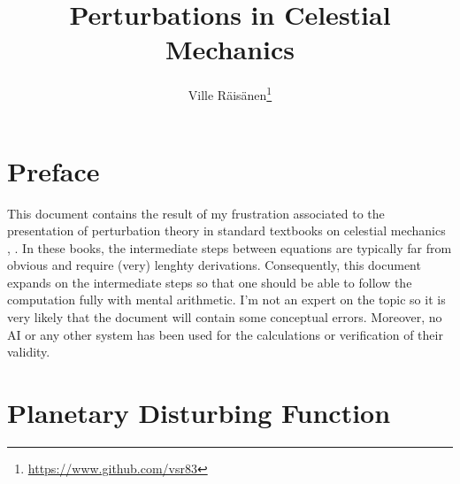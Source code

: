\documentclass [12pt, a4paper] {article}
\title{Perturbations in Celestial Mechanics}
\author{Ville R{\"a}is{\"a}nen\thanks{\url{https://www.github.com/vsr83}}}
\begin{document}
\maketitle

\section*{Preface}
This document contains the result of my frustration associated to the
presentation of perturbation theory in standard textbooks on celestial mechanics 
\cite{fitzpatrick}, \cite{murray_dermott}. In these books, the intermediate steps 
between equations are typically far from obvious and require (very) lenghty 
derivations. Consequently, this document expands on the intermediate steps so 
that one should be able to follow the computation fully with mental arithmetic.
I'm not an expert on the topic so it is very likely that the document will contain
some conceptual errors. Moreover, no AI or any other system has been used for the 
calculations or verification of their validity.

\newpage
\tableofcontents
\newpage
\section{Planetary Disturbing Function}
\end{document}
